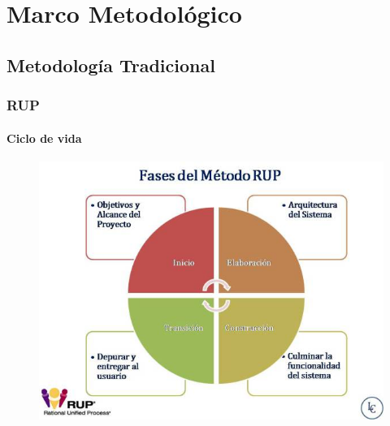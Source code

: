 \chapter{Marco Metodológico}


\section{Metodología Tradicional} 
\subsection{RUP}
\subsubsection{Ciclo de vida}

\begin{figure}[!htb]
	\includegraphics[width=\linewidth]{img/fases-rup.jpg}
	\endminipage\hfill
	
\end{figure}


